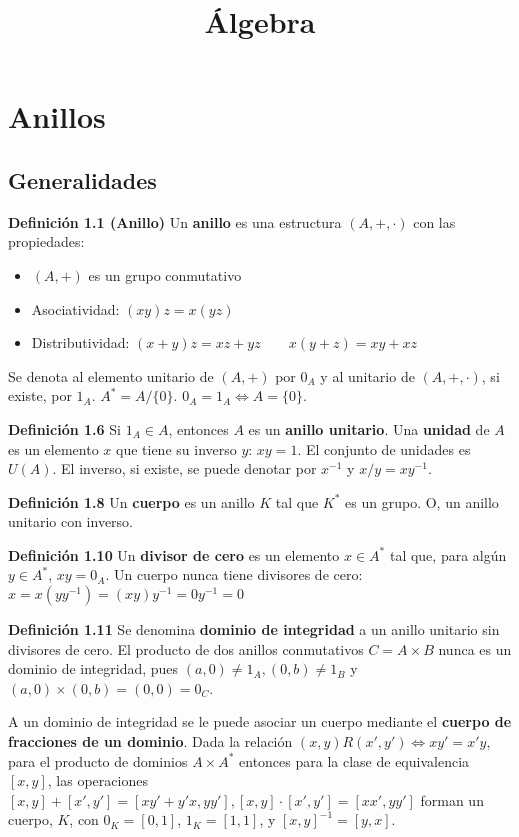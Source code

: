 \documentclass[a4paper, 11pt]{extarticle}
\date{}
\title{\Huge\vspace{-1em}Álgebra}
\newcommand{\defi}[1]{\textcolor{azul}{\textbf{Definición #1}}}
\begin{document}
\maketitle
\vspace{-8em}

\section*{Anillos}
\label{sec:orgf77ee56}
\vspace{-1em}
\subsection*{Generalidades}
\label{sec:org4dad383}
\vspace{-1em}
\defi{1.1 (Anillo)} Un \textbf{anillo} es una estructura \((A, +, \cdot)\) con las
propiedades: \vspace{-1em}
\begin{itemize}
\item \((A, +)\) es un grupo conmutativo
\item Asociatividad: \((xy)z = x(yz)\)
\item Distributividad: \((x + y)z = xz + yz \qquad x(y+z) = xy+xz\)
\end{itemize}
Se denota al elemento unitario de \((A, +)\) por \(0_A\) y al unitario de 
\((A, +, \cdot)\), si existe, por \(1_A\). \(A^* = A/ \{ 0 \}\). \(0_A =
1_A \iff A = \{ 0 \}\).

\defi{1.6} Si \(1_A \in A\), entonces \(A\) es un \textbf{anillo unitario}. Una
\textbf{unidad} de \(A\) es un elemento \(x\) que tiene su inverso \(y\): \(xy=1\). El conjunto de unidades es \(U(A)\). El inverso, si existe, se puede denotar por \(x
^{-1}\) y \(x/y = xy ^{-1}\).

\defi{1.8} Un \textbf{cuerpo} es un anillo \(K\) tal que \(K^*\) es un grupo. O, un
anillo unitario con inverso.  

\defi{1.10} Un \textbf{divisor de cero} es un elemento \(x \in A^*\) tal que, para
algún \(y \in A^*\), \(xy = 0_A\). Un cuerpo nunca tiene divisores de cero:
\(x = x(yy ^{-1}) = (xy) y ^{-1} = 0 y ^{-1} = 0\)

\defi{1.11} Se denomina \textbf{dominio de integridad} a un anillo unitario sin divisores
de cero. El producto de dos anillos conmutativos \(C = A \times  B\) nunca es
un dominio de integridad, pues \((a, 0) \neq 1_A, (0, b) \neq 1_B\) y \((a, 0) \times (0, b) = (0, 0) = 0_C\).

A un dominio de integridad se le puede asociar un cuerpo mediante el \textbf{cuerpo de
fracciones de un dominio}. 
Dada la relación \((x,y) R (x', y') \iff xy' = x'y\), para el producto de dominios \(A \times  A^*\) 
entonces para la clase de equivalencia \([x,y]\), las operaciones \([x,y] +
[x', y'] = [xy' + y'x, yy'], [x,y]\cdot [x',y'] = [xx', yy']\) forman un
cuerpo, \(K\), con \(0_K = [0, 1]\), \(1_K = [1,1]\), y \([x,y] ^{-1} =
 [y, x]\).
\end{document}
